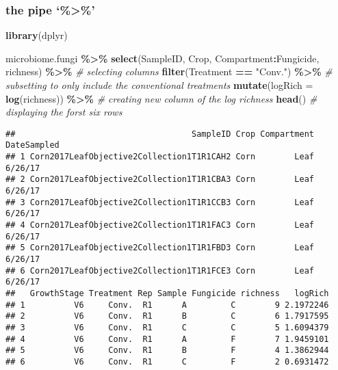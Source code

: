 \documentclass[
]{article}
\newenvironment{Shaded}{\begin{snugshade}}{\end{snugshade}}
\newcommand{\AttributeTok}[1]{\textcolor[rgb]{0.13,0.29,0.53}{#1}}
\newcommand{\CommentTok}[1]{\textcolor[rgb]{0.56,0.35,0.01}{\textit{#1}}}
\newcommand{\FunctionTok}[1]{\textcolor[rgb]{0.13,0.29,0.53}{\textbf{#1}}}
\newcommand{\NormalTok}[1]{#1}
\newcommand{\SpecialCharTok}[1]{\textcolor[rgb]{0.81,0.36,0.00}{\textbf{#1}}}
\newcommand{\StringTok}[1]{\textcolor[rgb]{0.31,0.60,0.02}{#1}}
\begin{document}
\subsubsection{the pipe `\%\textgreater\%'}\label{the-pipe}

\begin{Shaded}
\begin{Highlighting}[]
\FunctionTok{library}\NormalTok{(dplyr)}
\end{Highlighting}
\end{Shaded}

\begin{Shaded}
\begin{Highlighting}[]
\NormalTok{microbiome.fungi }\SpecialCharTok{\%\textgreater{}\%}
  \FunctionTok{select}\NormalTok{(SampleID, Crop, Compartment}\SpecialCharTok{:}\NormalTok{Fungicide, richness) }\SpecialCharTok{\%\textgreater{}\%}  \CommentTok{\# selecting columns}
  \FunctionTok{filter}\NormalTok{(Treatment }\SpecialCharTok{==} \StringTok{"Conv."}\NormalTok{) }\SpecialCharTok{\%\textgreater{}\%}  \CommentTok{\# subsetting to only include the conventional treatments}
  \FunctionTok{mutate}\NormalTok{(}\AttributeTok{logRich =} \FunctionTok{log}\NormalTok{(richness)) }\SpecialCharTok{\%\textgreater{}\%}  \CommentTok{\# creating new column of the log richness}
  \FunctionTok{head}\NormalTok{()  }\CommentTok{\# displaying the forst six rows}
\end{Highlighting}
\end{Shaded}

\begin{verbatim}
##                                    SampleID Crop Compartment DateSampled
## 1 Corn2017LeafObjective2Collection1T1R1CAH2 Corn        Leaf     6/26/17
## 2 Corn2017LeafObjective2Collection1T1R1CBA3 Corn        Leaf     6/26/17
## 3 Corn2017LeafObjective2Collection1T1R1CCB3 Corn        Leaf     6/26/17
## 4 Corn2017LeafObjective2Collection1T1R1FAC3 Corn        Leaf     6/26/17
## 5 Corn2017LeafObjective2Collection1T1R1FBD3 Corn        Leaf     6/26/17
## 6 Corn2017LeafObjective2Collection1T1R1FCE3 Corn        Leaf     6/26/17
##   GrowthStage Treatment Rep Sample Fungicide richness   logRich
## 1          V6     Conv.  R1      A         C        9 2.1972246
## 2          V6     Conv.  R1      B         C        6 1.7917595
## 3          V6     Conv.  R1      C         C        5 1.6094379
## 4          V6     Conv.  R1      A         F        7 1.9459101
## 5          V6     Conv.  R1      B         F        4 1.3862944
## 6          V6     Conv.  R1      C         F        2 0.6931472
\end{verbatim}
\end{document}
